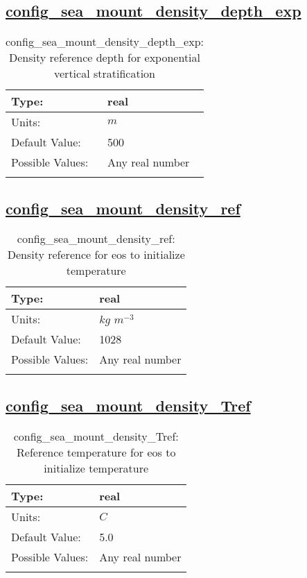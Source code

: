 \subsection[config\_sea\_mount\_density\_depth\_exp]{\hyperref[sec:nm_tab_sea_mount]{config\_sea\_mount\_density\_depth\_exp}}
\label{subsec:nm_sec_config_sea_mount_density_depth_exp}
\begin{center}
\begin{longtable}{| p{2.0in} || p{4.0in} |}
    \hline
    Type: & real \\
    \hline
    Units: & $m$ \\
    \hline
    Default Value: & 500 \\
    \hline
    Possible Values: & Any real number \\
    \hline
    \caption{config\_sea\_mount\_density\_depth\_exp: Density reference depth for exponential vertical stratification}
\end{longtable}
\end{center}
\subsection[config\_sea\_mount\_density\_ref]{\hyperref[sec:nm_tab_sea_mount]{config\_sea\_mount\_density\_ref}}
\label{subsec:nm_sec_config_sea_mount_density_ref}
\begin{center}
\begin{longtable}{| p{2.0in} || p{4.0in} |}
    \hline
    Type: & real \\
    \hline
    Units: & $kg$ $m^{-3}$ \\
    \hline
    Default Value: & 1028 \\
    \hline
    Possible Values: & Any real number \\
    \hline
    \caption{config\_sea\_mount\_density\_ref: Density reference for eos to initialize temperature}
\end{longtable}
\end{center}
\subsection[config\_sea\_mount\_density\_Tref]{\hyperref[sec:nm_tab_sea_mount]{config\_sea\_mount\_density\_Tref}}
\label{subsec:nm_sec_config_sea_mount_density_Tref}
\begin{center}
\begin{longtable}{| p{2.0in} || p{4.0in} |}
    \hline
    Type: & real \\
    \hline
    Units: & $C$ \\
    \hline
    Default Value: & 5.0 \\
    \hline
    Possible Values: & Any real number \\
    \hline
    \caption{config\_sea\_mount\_density\_Tref: Reference temperature for eos to initialize temperature}
\end{longtable}
\end{center}
